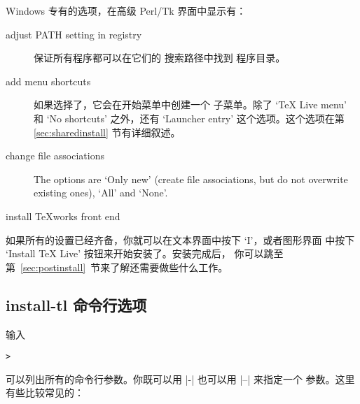 \documentclass{article}
\begin{document}
Windows 专有的选项，在高级 Perl/Tk 界面中显示有：
\begin{description}
\item[adjust PATH setting in registry] 保证所有程序都可以在它们的
搜索路径中找到 \TL{} 程序目录。

\item[add menu shortcuts] 如果选择了，它会在开始菜单中创建一个 \TL{}
子菜单。除了 `TeX Live menu' 和 `No shortcuts' 之外，还有 `Launcher entry'
这个选项。这个选项在第 \ref{sec:sharedinstall} 节有详细叙述。

\item[change file associations] The options are `Only new' (create
  file associations, but do not overwrite existing ones), `All' and
  `None'.

\item[install \TeX{}works front end]
\end{description}

如果所有的设置已经齐备，你就可以在文本界面中按下 `I'，或者图形界面
中按下 `Install TeX Live' 按钮来开始安装了。安装完成后，
你可以跳至第~\ref{sec:postinstall}~节来了解还需要做些什么工作。

\subsection{install-tl 命令行选项}
\label{sec:cmdline}

输入
\begin{alltt}
> 
\end{alltt}
可以列出所有的命令行参数。你既可以用 |-| 也可以用 |--| 来指定一个
参数。这里有些比较常见的：
\end{document}
